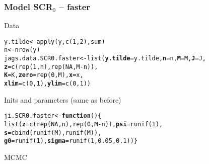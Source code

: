 \documentclass[color=usenames,dvipsnames]{beamer}\usepackage[]{graphicx}\usepackage[]{color}
\makeatletter
\newcommand{\hlnum}[1]{\textcolor[rgb]{0.69,0.494,0}{#1}}%
\newcommand{\hlopt}[1]{\textcolor[rgb]{0,0,0}{#1}}%
\newcommand{\hlstd}[1]{\textcolor[rgb]{0,0,0}{#1}}%
\newcommand{\hlkwa}[1]{\textcolor[rgb]{0,0,0}{\textbf{#1}}}%
\newcommand{\hlkwb}[1]{\textcolor[rgb]{0,0.341,0.682}{#1}}%
\newcommand{\hlkwc}[1]{\textcolor[rgb]{0,0,0}{\textbf{#1}}}%
\newcommand{\hlkwd}[1]{\textcolor[rgb]{0.004,0.004,0.506}{#1}}%
\newenvironment{kframe}{%
 \def\at@end@of@kframe{}%
 \ifinner\ifhmode%
  \def\at@end@of@kframe{\end{minipage}}%
  \begin{minipage}{\columnwidth}%
 \fi\fi%
 \def\FrameCommand##1{\hskip\@totalleftmargin \hskip-\fboxsep
 \colorbox{shadecolor}{##1}\hskip-\fboxsep
     \hskip-\linewidth \hskip-\@totalleftmargin \hskip\columnwidth}%
 \MakeFramed {\advance\hsize-\width
   \@totalleftmargin\z@ \linewidth\hsize
   \@setminipage}}%
 {\par\unskip\endMakeFramed%
 \at@end@of@kframe}
\newenvironment{knitrout}{}{} %
\makeatother
\begin{document}
\begin{frame}[fragile]
  \frametitle{Model SCR$_0$ -- faster}
  Data
  \vspace{-6pt}
\begin{knitrout}\scriptsize
{}\color{fgcolor}\begin{kframe}
\begin{alltt}
\hlstd{y.tilde} \hlkwb{<-} \hlkwd{apply}\hlstd{(y,} \hlkwd{c}\hlstd{(}\hlnum{1}\hlstd{,}\hlnum{2}\hlstd{), sum)}
\hlstd{n} \hlkwb{<-} \hlkwd{nrow}\hlstd{(y)}
\hlstd{jags.data.SCR0.faster} \hlkwb{<-} \hlkwd{list}\hlstd{(}\hlkwc{y.tilde}\hlstd{=y.tilde,} \hlkwc{n}\hlstd{=n,} \hlkwc{M}\hlstd{=M,} \hlkwc{J}\hlstd{=J,}
                              \hlkwc{z}\hlstd{=}\hlkwd{c}\hlstd{(}\hlkwd{rep}\hlstd{(}\hlnum{1}\hlstd{, n),} \hlkwd{rep}\hlstd{(}\hlnum{NA}\hlstd{, M}\hlopt{-}\hlstd{n)),}
                              \hlkwc{K}\hlstd{=K,} \hlkwc{zero}\hlstd{=}\hlkwd{rep}\hlstd{(}\hlnum{0}\hlstd{, M),} \hlkwc{x}\hlstd{=x,}
                              \hlkwc{xlim}\hlstd{=}\hlkwd{c}\hlstd{(}\hlnum{0}\hlstd{,}\hlnum{1}\hlstd{),} \hlkwc{ylim}\hlstd{=}\hlkwd{c}\hlstd{(}\hlnum{0}\hlstd{,}\hlnum{1}\hlstd{))}
\end{alltt}
\end{kframe}
\end{knitrout}
\pause
\vfill
  Inits and parameters (same as before)
\pause
\vfill
\begin{knitrout}\scriptsize
{}\color{fgcolor}\begin{kframe}
\begin{alltt}
\hlstd{ji.SCR0.faster} \hlkwb{<-} \hlkwa{function}\hlstd{() \{}
    \hlkwd{list}\hlstd{(}\hlkwc{z}\hlstd{=}\hlkwd{c}\hlstd{(}\hlkwd{rep}\hlstd{(}\hlnum{NA}\hlstd{, n),} \hlkwd{rep}\hlstd{(}\hlnum{0}\hlstd{,M}\hlopt{-}\hlstd{n)),} \hlkwc{psi}\hlstd{=}\hlkwd{runif}\hlstd{(}\hlnum{1}\hlstd{),}
         \hlkwc{s}\hlstd{=}\hlkwd{cbind}\hlstd{(}\hlkwd{runif}\hlstd{(M),} \hlkwd{runif}\hlstd{(M)),}
         \hlkwc{g0}\hlstd{=}\hlkwd{runif}\hlstd{(}\hlnum{1}\hlstd{),} \hlkwc{sigma}\hlstd{=}\hlkwd{runif}\hlstd{(}\hlnum{1}\hlstd{,} \hlnum{0.05}\hlstd{,} \hlnum{0.1}\hlstd{)) \}}
\end{alltt}
\end{kframe}
\end{knitrout}
MCMC
  \vspace{-6pt}
\begin{knitrout}\scriptsize
{}\color{fgcolor}\begin{kframe}

\end{kframe}
\end{knitrout}
\end{frame}
\end{document}
